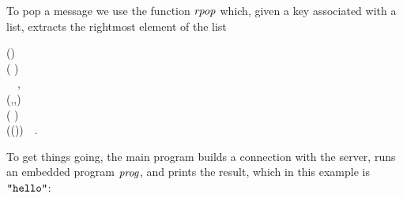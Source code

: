 To pop a message we use the function \ensuremath{\Varid{rpop}} which, given a key associated with
a list, extracts the rightmost element of the list
\begin{hscode}\SaveRestoreHook
{}%
%
%
%
\>[B]{}\<[6]%
\>[6]{}\mathbin{::}(\;\;\mathrel{\sim}\;){}\<[E]%
\\
\>[6]{}\Rightarrow {}\;\;\;( \uplus {}\;){}\<[E]%
\\
\>[B]{}\mathrel{=}\;~~,{}\<[E]%
\\[\blanklineskip]%
\>[B]{}\<[7]%
\>[7]{}\mathbin{::}(\;,\;,\;\;\mathrel{\sim}\;){}\<[E]%
\\
\>[7]{}\Rightarrow {}\;\to {}\;\;\;( \uplus {}\;){}\<[E]%
\\
\>[B]{}\;\mathrel{=}\;(\;(\;)\bind {})~~.{}\<[E]%
\ColumnHook
\end{hscode}\resethooks
To get things going, the main program builds a connection with the \Redis{}
server, runs an embedded program \ensuremath{\Varid{prog}}, and prints the result, which in this
example is \ensuremath{\text{\tt \char34 hello\char34}}:
